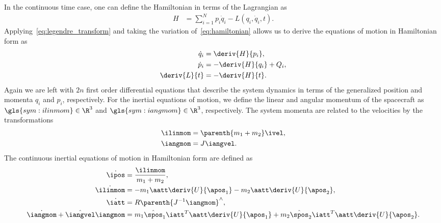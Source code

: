 In the continuous time case, one can define the Hamiltonian in terms of the Lagrangian as
\begin{align}\label{eq:hamiltonian}
	H &= \sum_{i = 1}^N p_i \dot{q}_i - L \left( q_i,\dot{q}_i, t \right).
\end{align}
Applying~\cref{eq:legendre_transform} and taking the variation of~\cref{eq:hamiltonian} allows us to derive the equations of motion in Hamiltonian form as
\begin{align}\label{eq:hamilton_eq}
	\dot{q}_i &= \deriv{H}{p_i}, \\
	\dot{p}_i &= - \deriv{H}{q_i} + Q_i, \\
	\deriv{L}{t} &= -\deriv{H}{t}.
\end{align}
Again we are left with \( 2n \) first order differential equations that describe the system dynamics in terms of the generalized position and momenta \( q_i \) and \( p_i\), respectively.
For the inertial equations of motion, we define the linear and angular momentum of the spacecraft as \( \gls{sym:ilinmom} \in \R^3\) and \( \gls{sym:iangmom} \in \R^3 \), respectively.
The system momenta are related to the velocities by the transformations
\begin{align}
    \ilinmom &= \parenth{m_1 + m_2} \ivel , \\
    \iangmom & = J \iangvel.
\end{align}
The continuous inertial equations of motion in Hamiltonian form are defined as
\begin{align}
    \dot \ipos &= \frac{\ilinmom}{m_1 + m_2}, \label{eq:inertial_position_dynamics_hamiltonian}\\
    \dot \ilinmom &= - m_1 \aatt \deriv{U}{\apos_1} - m_2 \aatt \deriv{U}{\apos_2}, \label{eq:inertial_velocity_dynamics_hamiltonian}\\
    \dot \iatt &= R \parenth{J^{-1} \iangmom}^\wedge, \label{eq:inertial_attitude_dynamics_hamiltonian}\\
    \dot\iangmom  + \hat{\iangvel} \iangmom &= m_1 \hat{\spos}_1 \iatt^T \aatt \deriv{U}{\apos_1} + m_2 \hat{\spos}_2 \iatt^T \aatt \deriv{U}{\apos_2}. \label{eq:inertial_angvel_dynamics_hamiltonian}
\end{align}

